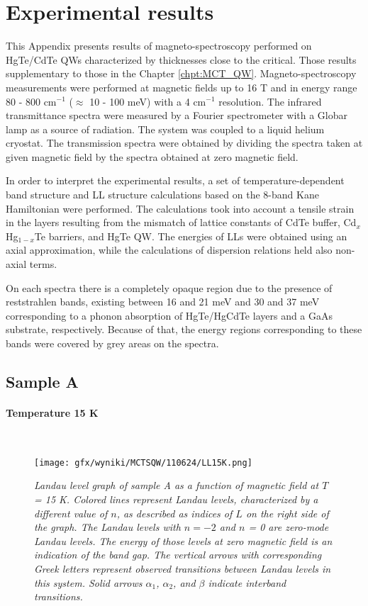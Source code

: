 \documentclass[titlepage,a4paper]{book}
\newcommand{\wciecie}{\quad\phantom{v}}
\newcommand{\myparagraph}[1]{\paragraph{#1}\mbox{}\\}
\begin{document}
\clearpage
\section{Experimental results}
This Appendix presents results of magneto-spectroscopy performed on HgTe/CdTe QWs characterized by thicknesses close to the critical. Those results supplementary to those in the Chapter \ref{chpt:MCT_QW}. Magneto-spectroscopy measurements were performed at magnetic fields up to 16 T and in energy range 80 - 800 cm$^{-1}$ ($\approx$ 10 - 100 meV) with a 4 cm$^{-1}$ resolution. The infrared transmittance spectra were measured by a Fourier spectrometer with a Globar lamp as a source of radiation. The system was coupled to a liquid helium cryostat. The transmission spectra were obtained by dividing the spectra taken at given magnetic field by the spectra obtained at zero magnetic field.

In order to interpret the experimental results, a set of temperature-dependent band structure and LL structure calculations based on the 8-band Kane Hamiltonian were performed. The calculations took into account a tensile strain in the layers resulting from the mismatch of lattice constants of CdTe buffer, Cd$_{x}$Hg$_{1-x}$Te barriers, and HgTe QW. The energies of LLs were obtained using an axial approximation, while the calculations of dispersion relations held also non-axial terms.

On each spectra there is a completely opaque region due to the presence of reststrahlen bands, existing between 16 and 21 meV and 30 and 37 meV corresponding to a phonon absorption of HgTe/HgCdTe layers and a GaAs substrate, respectively. Because of that, the energy regions corresponding to these bands were covered by grey areas on the spectra.

\subsection{Sample A}
\wciecie

\myparagraph{Temperature 15 K}
\wciecie
\begin{figure}[H]
	\centering
	\texttt{[image: gfx/wyniki/MCTSQW/110624/LL15K.png]}
	\vspace{-10pt}
	\caption{\textit{Landau level graph of sample A as a function of magnetic field at $T$ = 15 K. Colored lines represent Landau levels, characterized by a different value of $n$, as described as indices of $L$ on the right side of the graph. The Landau levels with $n = -2$ and $n$ = 0 are zero-mode Landau levels. The energy of those levels at zero magnetic field is an indication of the band gap. The vertical arrows with corresponding Greek letters represent observed transitions between Landau levels in this system. Solid arrows $\alpha_1$, $\alpha_2$, and $\beta$ indicate interband transitions.}}
	\label{fig:LL_110624_15K}
\end{figure}
\end{document}
